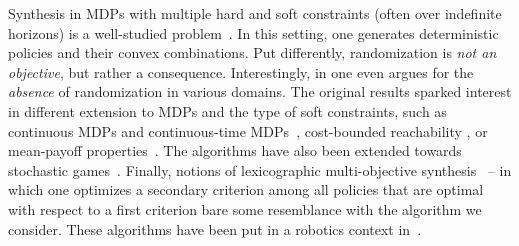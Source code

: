 \documentclass[conference]{IEEEtran}
\theoremstyle{remark}
\begin{document}
Synthesis in MDPs with multiple hard and soft constraints (often over indefinite horizons) is a well-studied problem~\cite{DBLP:conf/stacs/ChatterjeeMH06,DBLP:conf/tacas/EtessamiKVY07,DBLP:conf/atva/ForejtKP12,DBLP:journals/fmsd/RandourRS17}.  In this setting, one generates deterministic policies and their convex combinations. Put differently, randomization is \emph{not an objective}, but rather a consequence. Interestingly, in \cite{DBLP:conf/tacas/DelgrangeKQR20} one even argues for the \emph{absence} of randomization in various domains.  
The original results sparked interest in different extension to MDPs and the type of soft constraints, such as continuous MDPs \cite{DBLP:journals/csysl/HaesaertNS21} and continuous-time MDPs~\cite{DBLP:conf/cav/QuatmannJK17},  cost-bounded reachability \cite{DBLP:journals/jar/HartmannsJKQ20}, or mean-payoff properties~\cite{DBLP:journals/corr/abs-1104-3489}. 
The algorithms have also been extended towards stochastic games~\cite{DBLP:conf/mfcs/ChenFKSW13,DBLP:journals/sttt/KwiatkowskaPW18}.
Finally, notions of lexicographic multi-objective synthesis~\cite{DBLP:conf/cav/ChatterjeeKWW20} -- in which one optimizes a secondary criterion among all policies that are optimal with respect to a first criterion bare some resemblance with the algorithm we consider. 
These algorithms have been put in a robotics context in~\cite{DBLP:journals/ijrr/LacerdaFPH19}.




\end{document}
